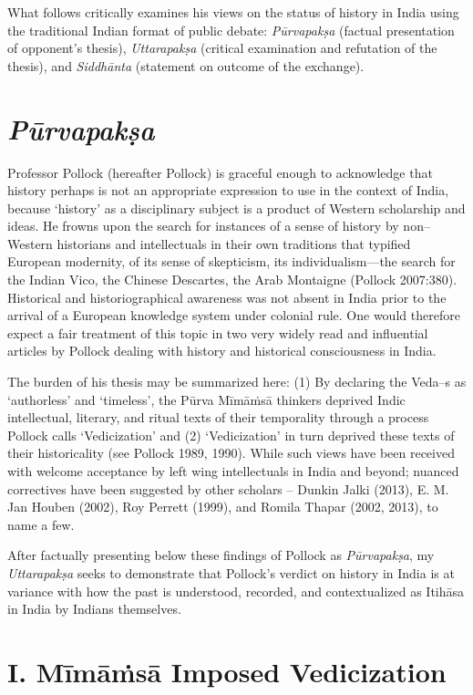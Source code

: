 What follows critically examines his views on the status of history in India using the traditional Indian format of public debate: \textit{Pūrvapakṣa} (factual presentation of opponent’s thesis), \textit{Uttarapakṣa} (critical examination and refutation of the thesis), and \textit{Siddhānta} (statement on outcome of the exchange).


\section*{\textit{Pūrvapakṣa}}

Professor Pollock (hereafter Pollock) is graceful enough to acknowledge that history perhaps is not an appropriate expression to use in the context of India, because ‘history’ as a disciplinary subject is a product of Western scholarship and ideas. He frowns upon the search for instances of a sense of history by non–Western historians and intellectuals in their own traditions that typified European modernity, of its sense of skepticism, its individualism—the search for the Indian Vico, the Chinese Descartes, the Arab Montaigne (Pollock 2007:380). Historical and historiographical awareness was not absent in India prior to the arrival of a European knowledge system under colonial rule. One would therefore expect a fair treatment of this topic in two very widely read and influential articles by Pollock dealing with history and historical consciousness in India.

The burden of his thesis may be summarized here: (1) By declaring the Veda–s as ‘authorless’ and ‘timeless’, the Pūrva Mīmāṁsā thinkers deprived Indic intellectual, literary, and ritual texts of their temporality through a process Pollock calls ‘Vedicization’ and (2) ‘Vedicization’ in turn deprived these texts of their historicality (see Pollock 1989, 1990). While such views have been received with welcome acceptance by left wing intellectuals in India and beyond; nuanced correctives have been suggested by other scholars – Dunkin Jalki (2013), E. M. Jan Houben (2002), Roy Perrett (1999), and Romila Thapar (2002, 2013), to name a few.

After factually presenting below these findings of Pollock as \textit{Pūrvapakṣa}, my \textit{Uttarapakṣa} seeks to demonstrate that Pollock’s verdict on history in India is at variance with how the past is understood, recorded, and contextualized as Itihāsa in India by Indians themselves.


\section*{I. Mīmāṁsā Imposed Vedicization}

